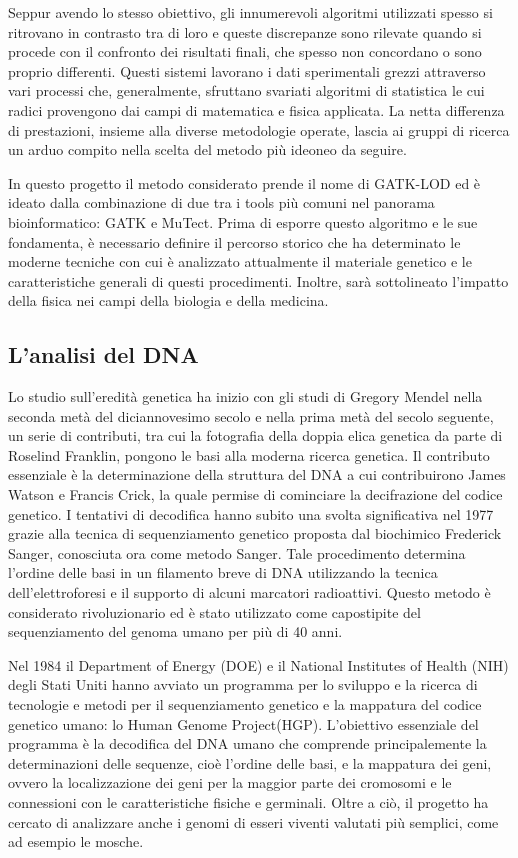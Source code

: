 Seppur avendo lo stesso obiettivo, gli innumerevoli algoritmi utilizzati spesso si ritrovano in contrasto tra di loro e queste discrepanze sono rilevate quando si procede con il confronto dei risultati finali, che spesso non concordano o sono proprio differenti.
Questi sistemi lavorano i dati sperimentali grezzi attraverso vari processi che, generalmente, sfruttano svariati algoritmi di statistica le cui radici provengono dai campi di matematica e fisica applicata.
La netta differenza di prestazioni, insieme alla diverse metodologie operate, lascia ai gruppi di ricerca un arduo compito nella scelta del metodo più ideoneo da seguire.

In questo progetto il metodo considerato prende il nome di GATK-LOD ed è ideato dalla combinazione di due tra i tools più comuni nel panorama bioinformatico: GATK e MuTect.
Prima di esporre questo algoritmo e le sue fondamenta, è necessario definire il percorso storico che ha determinato le moderne tecniche con cui è analizzato attualmente il materiale genetico e le caratteristiche generali di questi procedimenti.
Inoltre, sarà sottolineato l'impatto della fisica nei campi della biologia e della medicina.

\subsection{L'analisi del DNA}
Lo studio sull'eredità genetica ha inizio con gli studi di Gregory Mendel nella seconda metà del diciannovesimo secolo e nella prima metà del secolo seguente, un serie di contributi, tra cui la fotografia della doppia elica genetica da parte di Roselind Franklin, pongono le basi alla moderna ricerca genetica.
Il contributo essenziale è la determinazione della struttura del DNA a cui contribuirono James Watson e Francis Crick, la quale permise di cominciare la decifrazione del codice genetico.
I tentativi di decodifica hanno subito una svolta significativa nel 1977 grazie alla tecnica di sequenziamento genetico proposta dal biochimico Frederick Sanger, conosciuta ora come metodo Sanger.
Tale procedimento determina l'ordine delle basi in un filamento breve di DNA utilizzando la tecnica dell'elettroforesi e il supporto di alcuni marcatori radioattivi.
Questo metodo è considerato rivoluzionario ed è stato utilizzato come capostipite del sequenziamento del genoma umano per più di 40 anni.

Nel 1984 il Department of Energy (DOE) e il National Institutes of Health (NIH) degli Stati Uniti hanno avviato un programma per lo sviluppo e la ricerca di tecnologie e metodi per il sequenziamento genetico e la mappatura del codice genetico umano: lo Human Genome Project(HGP).
L'obiettivo essenziale del programma è la decodifica del DNA umano che comprende principalemente la determinazioni delle sequenze, cioè l'ordine delle basi, e la mappatura dei geni, ovvero la localizzazione dei geni per la maggior parte dei cromosomi e le connessioni con le caratteristiche fisiche e germinali.
Oltre a ciò, il progetto ha cercato di analizzare anche i genomi di esseri viventi valutati più semplici, come ad esempio le mosche.

